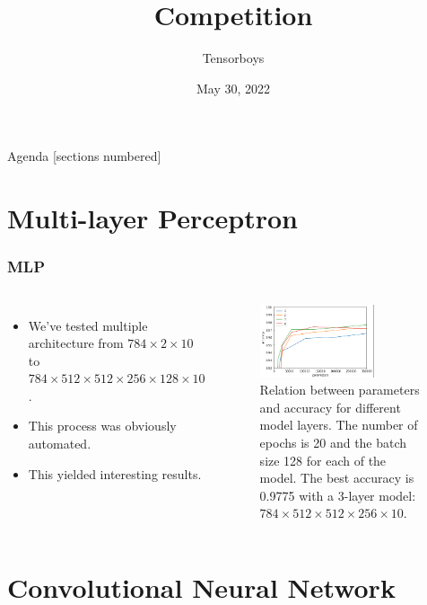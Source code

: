 \documentclass[aspectratio=169]{beamer}
\title{Competition}
\date{May 30, 2022}
\author{Tensorboys}
\institute{Pattern Recognition}
\begin{document}
\maketitle

\begin{frame}{Agenda}
    [sections numbered]
    \tableofcontents
\end{frame}
\section{Multi-layer Perceptron}
\begin{frame}[t]
    \frametitle{MLP}
    \begin{columns}

        \begin{itemize}
            \item We've tested multiple architecture from $784\times 2 \times 10$ to $784\times 512 \times 512\times 256 \times 128 \times 10$.
            \item This process was obviously automated.
            \item This yielded interesting results.
        \end{itemize}
        \begin{figure}[ht!]
            \centering
            \includegraphics[width=0.7\textwidth]{figures/mlp_layers.png}
            \caption{Relation between parameters and accuracy for different model layers. The number of epochs is 20 and the batch size 128 for each of the model. The best accuracy is 0.9775 with a 3-layer model: $784\times512\times512\times256\times10$.}
            \label{fig:}
        \end{figure}
    \end{columns}
\end{frame}
\section{Convolutional Neural Network}
\end{document}
